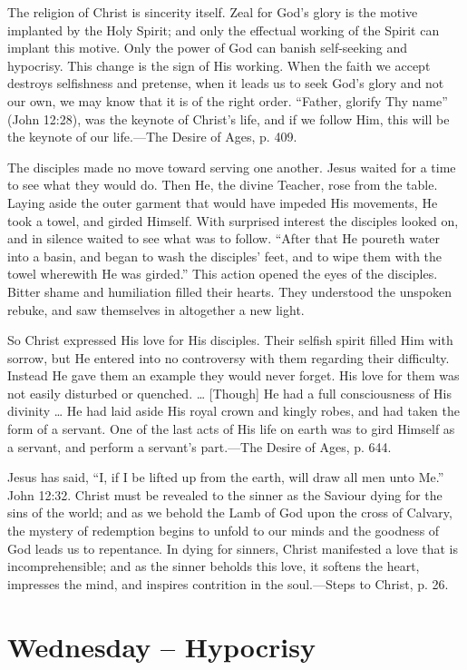 \documentclass[a4paper, 10pt, twoside, headings=small]{scrartcl}
\begin{document}
\begin{multicols}{2}
The religion of Christ is sincerity itself. Zeal for God’s glory is the motive implanted by the Holy Spirit; and only the effectual working of the Spirit can implant this motive. Only the power of God can banish self-seeking and hypocrisy. This change is the sign of His working. When the faith we accept destroys selfishness and pretense, when it leads us to seek God’s glory and not our own, we may know that it is of the right order. “Father, glorify Thy name” (John 12:28), was the keynote of Christ’s life, and if we follow Him, this will be the keynote of our life.—The Desire of Ages, p. 409.

The disciples made no move toward serving one another. Jesus waited for a time to see what they would do. Then He, the divine Teacher, rose from the table. Laying aside the outer garment that would have impeded His movements, He took a towel, and girded Himself. With surprised interest the disciples looked on, and in silence waited to see what was to follow. “After that He poureth water into a basin, and began to wash the disciples’ feet, and to wipe them with the towel wherewith He was girded.” This action opened the eyes of the disciples. Bitter shame and humiliation filled their hearts. They understood the unspoken rebuke, and saw themselves in altogether a new light.

So Christ expressed His love for His disciples. Their selfish spirit filled Him with sorrow, but He entered into no controversy with them regarding their difficulty. Instead He gave them an example they would never forget. His love for them was not easily disturbed or quenched. … [Though] He had a full consciousness of His divinity … He had laid aside His royal crown and kingly robes, and had taken the form of a servant. One of the last acts of His life on earth was to gird Himself as a servant, and perform a servant’s part.—The Desire of Ages, p. 644.

Jesus has said, “I, if I be lifted up from the earth, will draw all men unto Me.” John 12:32. Christ must be revealed to the sinner as the Saviour dying for the sins of the world; and as we behold the Lamb of God upon the cross of Calvary, the mystery of redemption begins to unfold to our minds and the goodness of God leads us to repentance. In dying for sinners, Christ manifested a love that is incomprehensible; and as the sinner beholds this love, it softens the heart, impresses the mind, and inspires contrition in the soul.—Steps to Christ, p. 26.

\section*{Wednesday – Hypocrisy}


\end{multicols}
\end{document}

